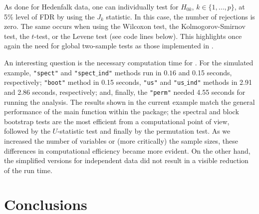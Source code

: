 As done for Hedenfalk data, one can individually test for  $H_{0k}$, $k\in\{1,\ldots, p\}$, at 5\% level of FDR by using the $J_k$ statistic. In this case, the number of rejections is zero. The same occurs when using the Wilcoxon test, the Kolmogorov-Smirnov test, the $t$-test, or the Levene test (see code lines below). This highlights once again the need for global two-sample tests as those implemented in .


An interesting question is the  necessary computation time for . For the simulated example,  \texttt{"spect"} and \texttt{"spect$\_$ind"} methods run in $0.16$ and 0.15 seconds, respectively; \texttt{"boot"} method in 0.15 seconds, \texttt{"us"} and  \texttt{"us$\_$ind"} methods in 2.91 and 2.86 seconds, respectively; and, finally, the \texttt{"perm"} needed 4.55 seconds for running the analysis. The results shown in the current example match the general performance of the main function within the package; the spectral and block bootstrap tests are the most efficient from a computational point of view, followed by the $U$-statistic test and finally by the permutation test. As we increased the number of variables or (more critically) the sample sizes, these differences in computational efficiency became more evident. On the other hand, the simplified versions for independent data did not result in a visible reduction of the run time.


\section{Conclusions}\label{se:con}

